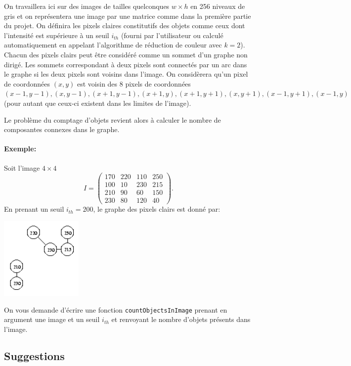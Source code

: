 \documentclass[a4paper,10pt]{article}
\begin{document}
On travaillera ici sur des images de tailles quelconques $w\times h$
en 256 niveaux de gris et on représentera une image par une matrice
comme dans la première partie du projet. On définira les pixels
claires constitutifs des objets comme ceux dont l'intensité est
supérieure à un seuil $i_{th}$ (fourni par l'utilisateur ou calculé
automatiquement en appelant l'algorithme de réduction de couleur avec
$k=2$). Chacun des pixels clairs peut être considéré comme un sommet
d'un graphe non dirigé. Les sommets correspondant à deux pixels sont
connectés par un arc dans le graphe si les deux pixels sont voisins
dans l'image. On considèrera qu'un pixel de coordonnées $(x,y)$ est
voisin des 8 pixels de coordonnées $(x-1,y-1), (x,y-1), (x+1,y-1),
(x+1,y), (x+1, y+1), (x,y+1), (x-1,y+1), (x-1,y)$ (pour autant que
ceux-ci existent dans les limites de l'image).

Le problème du comptage d'objets revient alors à calculer le nombre de
composantes connexes dans le graphe.

\paragraph{Exemple:} Soit l'image $4\times 4$
$$I=\left(\begin{matrix}
170&220&110&250\\
100&10&230&215\\
210&90&60&150\\
230&80&120&40
\end{matrix}\right).
$$
En prenant un seuil $i_{th}=200$, le graphe des pixels clairs est donné par:
\begin{center}
\includegraphics[width=4cm]{pict3.pdf}
\end{center}

On vous demande d'écrire une fonction \texttt{countObjectsInImage}
prenant en argument une image et un seuil $i_{th}$ et renvoyant le nombre d'objets
présents dans l'image.

\subsection*{Suggestions}
\end{document}
